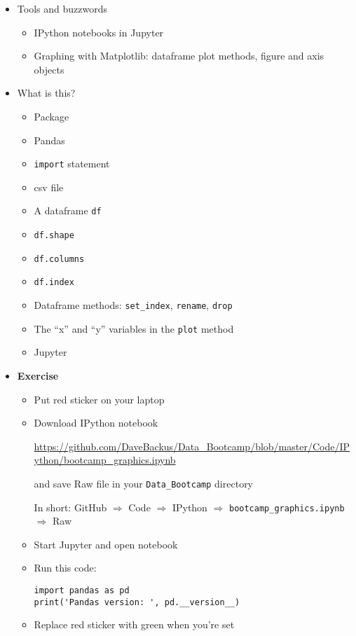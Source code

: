 \documentclass[11pt]{article}
\begin{document}
\begin{itemize}
\item Tools and buzzwords
\begin{itemize}
\item IPython notebooks in Jupyter
\item Graphing with Matplotlib: dataframe plot methods, figure and axis objects
\end{itemize}

\item What is this?
\begin{itemize}
\item Package
\item Pandas
\item {\tt import} statement
\item csv file
\item A dataframe {\tt df}
\item {\tt df.shape}
\item {\tt df.columns}
\item {\tt df.index}
\item Dataframe methods:  \verb|set_index|, {\tt rename}, {\tt drop}
\item The ``x'' and ``y'' variables in the {\tt plot} method
\item Jupyter
\end{itemize}

\item {\bf Exercise}
\begin{itemize}
\item Put red sticker on your laptop

\item Download IPython notebook

\url{https://github.com/DaveBackus/Data_Bootcamp/blob/master/Code/IPython/bootcamp_graphics.ipynb}

and save Raw file in your \verb|Data_Bootcamp| directory

In short:  GitHub $\Rightarrow$ Code $\Rightarrow$ IPython $\Rightarrow$ \verb|bootcamp_graphics.ipynb|
$\Rightarrow$ Raw

\item Start Jupyter and open notebook
\item Run this code:
\begin{verbatim}
import pandas as pd
print('Pandas version: ', pd.__version__)
\end{verbatim}
\item Replace red sticker with green when you're set
\end{itemize}


\end{itemize}
\end{document}
